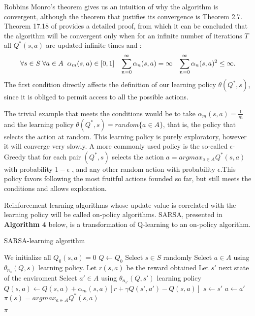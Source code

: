 \documentclass[12pt]{article}
\numberwithin{equation}{section}
\begin{document}
Robbins Monro's theorem gives us an intuition of why the algorithm is convergent, although the theorem that justifies its convergence is Theorem 2.7. Theorem 17.18  of \cite{mohri2018foundations} provides a detailed proof, from which it can be concluded that the algorithm will be convergent only  when for an infinite number of iterations $T$ all $Q^*(s,a)$ are updated infinite times and :$$   \forall s \in S  \hspace{1mm}  \forall a \in A    \hspace{2mm}  \alpha_m(s,a)\in[0,1]  \hspace{3mm} \sum_{n=0}^{\infty}\alpha_n(s,a)=\infty \hspace{3mm}\sum_{n=0}^{\infty}\alpha_n(s,a)^2 \leq\infty  .$$The first condition directly affects the definition of our learning policy $\theta(Q^*,s)$, since it is obliged to permit access to all the possible actions.



The trivial example that meets the conditions would be to take $\alpha_m(s,a)=\frac{1}{m}$ and the learning policy $\theta(Q^*,s)=random\{ a\in A\}$, that is, the policy that selects the action at random. This learning policy is purely exploratory, however it will converge very slowly. A  more commonly used policy is the so-called $\epsilon$-Greedy that for each pair $(Q^*,s)$ selects the action $a=argmax_{a\in A} Q^*(s,a)$ with probability $1-\epsilon$ , and any other random action with probability $\epsilon$.This policy favors following the most fruitful actions founded  so far, but 
 still meets the conditions and allows exploration.


Reinforcement learning algorithms whose update value is correlated with the learning policy will be called on-policy algorithms. SARSA,  presented  in {\bf Algorithm 4} below, is a transformation of Q-learning to an on-policy algorithm.


\begin{algorithm}
\caption{SARSA-learning algorithm}
\begin{algorithmic}
\State We initialize all  \hspace{2mm} $Q_0(s,a)=0$
\State $Q \longleftarrow Q_0$
\State Select $s\in S$ randomly
\State Select $a \in A$ using $\theta_{n_s}(Q,s)$ learning policy.
\State Let  $r(s,a)$ be the reward obtained
\State Let  $s'$ next state of the enviroment
\State Select $a' \in A$ using $\theta_{n_{s'}}(Q,s')$ learning policy
\State $Q(s,a)\leftarrow Q(s,a) + \alpha_m(s,a)[r+ \gamma Q(s',a') -Q(s,a)] $ 
\State $s \leftarrow s'$
\State $a \leftarrow a'$
\EndFor
\EndFor
\State $\pi(s)=argmax_{a\in A}Q^*(s,a)$

\Return $\pi$ 
\end{algorithmic}
\end{algorithm}
\end{document}
